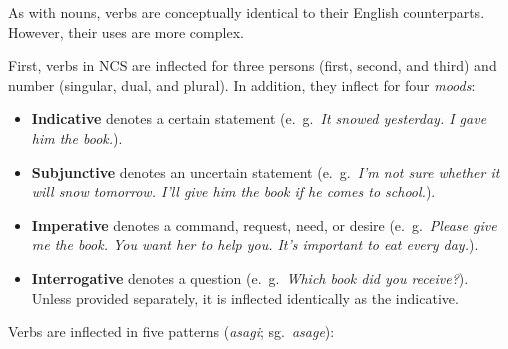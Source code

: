 As with nouns, verbs are conceptually identical to their English counterparts. However, their uses are more complex.

First, verbs in NCS are inflected for three persons (first, second, and third) and number (singular, dual, and plural). In addition, they inflect for four \emph{moods}:

\begin{itemize}
  \item \textbf{Indicative} denotes a certain statement (e.~g.~\emph{It snowed yesterday. I gave him the book.}).
  \item \textbf{Subjunctive} denotes an uncertain statement (e.~g.~\emph{I'm not sure whether it will snow tomorrow. I'll give him the book if he \emph{comes to school}.}).
  \item \textbf{Imperative} denotes a command, request, need, or desire (e.~g.~\emph{Please give me the book. You want her to help you. It's important to eat every day.}).
  \item \textbf{Interrogative} denotes a question (e.~g.~\emph{Which book did you receive?}). Unless provided separately, it is inflected identically as the indicative.
\end{itemize}

Verbs are inflected in five patterns (\emph{asagi}; sg.~\emph{asage}): \\

